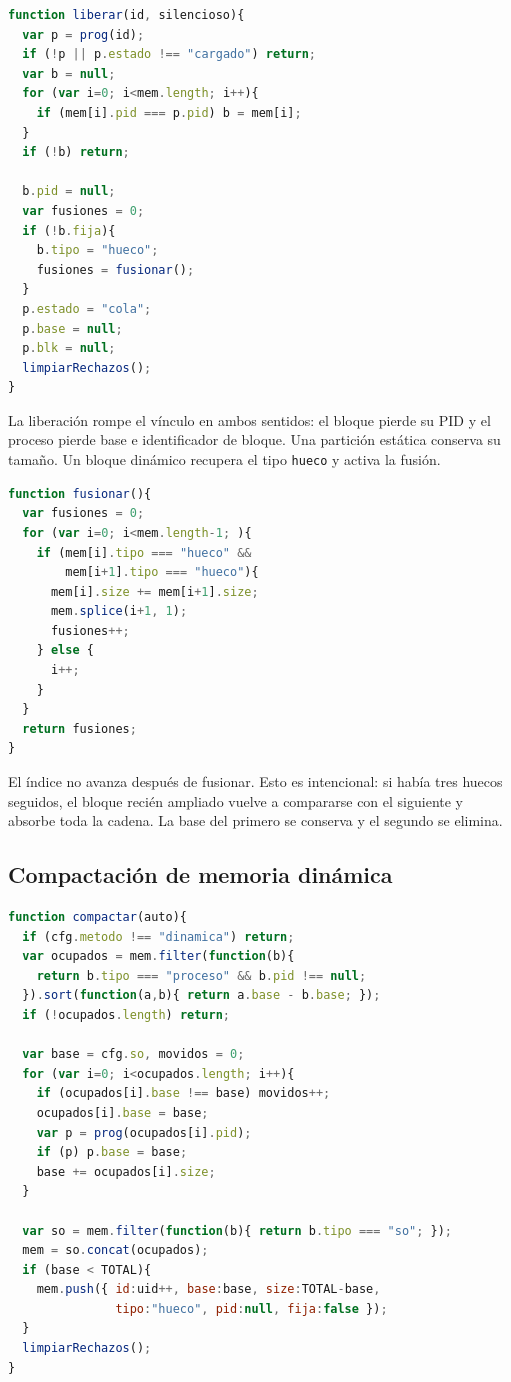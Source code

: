 \documentclass[11pt,a4paper]{article}
\begin{document}
\begin{lstlisting}[language=JavaScript,caption={Liberación de un proceso.}]
function liberar(id, silencioso){
  var p = prog(id);
  if (!p || p.estado !== "cargado") return;
  var b = null;
  for (var i=0; i<mem.length; i++){
    if (mem[i].pid === p.pid) b = mem[i];
  }
  if (!b) return;

  b.pid = null;
  var fusiones = 0;
  if (!b.fija){
    b.tipo = "hueco";
    fusiones = fusionar();
  }
  p.estado = "cola";
  p.base = null;
  p.blk = null;
  limpiarRechazos();
}
\end{lstlisting}

La liberación rompe el vínculo en ambos sentidos: el bloque pierde su PID y el
proceso pierde base e identificador de bloque. Una partición estática conserva su
tamaño. Un bloque dinámico recupera el tipo \texttt{hueco} y activa la fusión.

\begin{lstlisting}[language=JavaScript,caption={Coalescencia de huecos vecinos.}]
function fusionar(){
  var fusiones = 0;
  for (var i=0; i<mem.length-1; ){
    if (mem[i].tipo === "hueco" &&
        mem[i+1].tipo === "hueco"){
      mem[i].size += mem[i+1].size;
      mem.splice(i+1, 1);
      fusiones++;
    } else {
      i++;
    }
  }
  return fusiones;
}
\end{lstlisting}

El índice no avanza después de fusionar. Esto es intencional: si había tres
huecos seguidos, el bloque recién ampliado vuelve a compararse con el siguiente y
absorbe toda la cadena. La base del primero se conserva y el segundo se elimina.

\subsection{Compactación de memoria dinámica}

\begin{lstlisting}[language=JavaScript,caption={Reubicación de procesos y creación de un hueco final.}]
function compactar(auto){
  if (cfg.metodo !== "dinamica") return;
  var ocupados = mem.filter(function(b){
    return b.tipo === "proceso" && b.pid !== null;
  }).sort(function(a,b){ return a.base - b.base; });
  if (!ocupados.length) return;

  var base = cfg.so, movidos = 0;
  for (var i=0; i<ocupados.length; i++){
    if (ocupados[i].base !== base) movidos++;
    ocupados[i].base = base;
    var p = prog(ocupados[i].pid);
    if (p) p.base = base;
    base += ocupados[i].size;
  }

  var so = mem.filter(function(b){ return b.tipo === "so"; });
  mem = so.concat(ocupados);
  if (base < TOTAL){
    mem.push({ id:uid++, base:base, size:TOTAL-base,
               tipo:"hueco", pid:null, fija:false });
  }
  limpiarRechazos();
}
\end{lstlisting}
\end{document}
